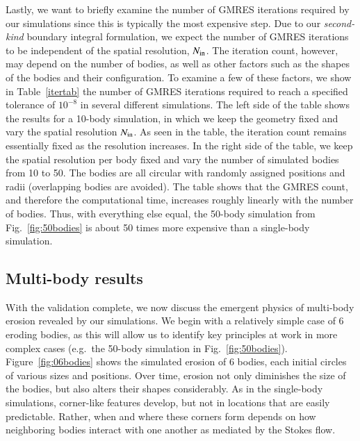 \documentclass[preprint, 10pt]{elsarticle}
\begin{document}
Lastly, we want to briefly examine the number of GMRES iterations
required by our simulations since this is typically the most expensive
step. Due to our {\em second-kind} boundary integral formulation, we
expect the number of GMRES iterations to be independent of the spatial
resolution, $N_{\mathrm{in}}$. The iteration count, however, may depend on the
number of bodies, as well as other factors such as the shapes of the
bodies and their configuration. To examine a few of these factors, we
show in Table~\ref{itertab} the number of GMRES iterations required to
reach a specified tolerance of $10^{-8}$ in several different
simulations. The left side of the table shows the results for a 10-body
simulation, in which we keep the geometry fixed and vary the spatial
resolution $N_{\mathrm{in}}$. As seen in the table, the iteration count remains
essentially fixed as the resolution increases. In the right side of the
table, we keep the spatial resolution per body fixed and vary the number of simulated bodies from 10 to 50. The bodies are all circular with randomly assigned positions and radii (overlapping bodies are avoided). The table shows that the GMRES count, and therefore the computational time, increases roughly linearly with the number of bodies. Thus, with everything else equal, the 50-body simulation from Fig.~\ref{fig:50bodies} is about 50 times more expensive than a single-body simulation.


\subsection{Multi-body results}

With the validation complete, we now discuss the emergent physics of
multi-body erosion revealed by our simulations. We begin with a
relatively simple case of 6 eroding bodies, as this will allow us to
identify key principles at work in more complex cases (e.g.~the 50-body
simulation in Fig.~\ref{fig:50bodies}). Figure~\ref{fig:06bodies} shows
the simulated erosion of 6 bodies, each initial circles of various sizes
and positions. Over time, erosion not only diminishes the size of the
bodies, but also alters their shapes considerably. As in the single-body simulations, corner-like features develop, but not in locations that are easily predictable. Rather, when and where these corners form depends on how neighboring bodies interact with one another as mediated by the Stokes flow.
\end{document}
